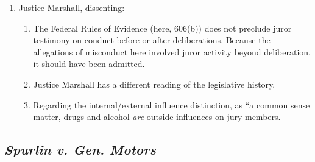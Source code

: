 \begin{enumerate}
\begin{enumerate}
    \end{enumerate}
    \item Justice Marshall, dissenting:
    \begin{enumerate}
        \item The Federal Rules of Evidence (here, 606(b)) does not preclude juror testimony on conduct before or after deliberations. Because the allegations of misconduct here involved juror activity beyond deliberation, it should have been admitted.
        \item Justice Marshall has a different reading of the legislative history.
        \item Regarding the internal/external influence distinction, as ``a common sense matter, drugs and alcohol \emph{are} outside influences on jury members.
    \end{enumerate}
\end{enumerate}

\subsection{\emph{Spurlin v. Gen. Motors}}

